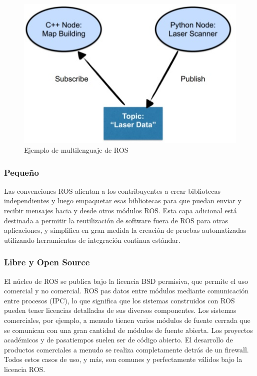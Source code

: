             \begin{figure}[htb]
                \centering
                \includegraphics[width=0.5\linewidth]{Main/Chapter3/Images3/multilenguaje_1.png}
                \caption{Ejemplo de multilenguaje de ROS}
                \label{f:Cap3-5_multilenguaje_ros}
            \end{figure}

\newpage
            
        \subsubsection{Pequeño}
        
            Las convenciones ROS alientan a los contribuyentes a crear bibliotecas independientes y luego empaquetar esas bibliotecas para que puedan enviar y recibir mensajes hacia y desde otros módulos ROS. Esta capa adicional está destinada a permitir la reutilización de software fuera de ROS para otras aplicaciones, y simplifica en gran medida la creación de pruebas automatizadas utilizando herramientas de integración continua estándar.
            
        \subsubsection{Libre y Open Source}
        
            El núcleo de ROS se publica bajo la licencia BSD permisiva, que permite el uso comercial y no comercial. ROS pas datos entre módulos mediante comunicación entre procesos (IPC), lo que significa que los sistemas construidos con ROS pueden tener licencias detalladas de sus diversos componentes. Los sistemas comerciales, por ejemplo, a menudo tienen varios módulos de fuente cerrada que se comunican con una gran cantidad de módulos de fuente abierta. Los proyectos académicos y de pasatiempos suelen ser de código abierto. El desarrollo de productos comerciales a menudo se realiza completamente detrás de un firewall. Todos estos casos de uso, y más, son comunes y perfectamente válidos bajo la licencia ROS.
            
